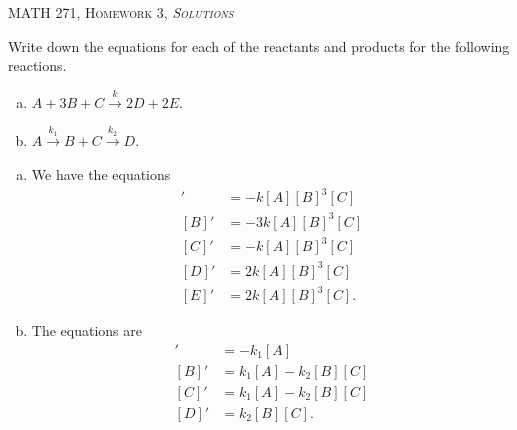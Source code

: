 \documentclass[12pt]{article} %
\begin{document}
\begin{center}
   \textsc{\large MATH 271, Homework 3, \emph{Solutions}}\\
\end{center}
\vspace{.5cm}

\begin{problem}
Write down the equations for each of the reactants and products for the following reactions.
\begin{enumerate}[(a)]
    \item $A + 3B + C \xrightarrow{k} 2D+2E$.
    \item $A \xrightarrow{k_1} B + C \xrightarrow{k_2} D$.
\end{enumerate}
\end{problem}
\begin{solution}
\begin{enumerate}[(a)]
    \item We have the equations
    \begin{align*}
        [A]' &= -k[A][B]^3[C]\\
        [B]' &= -3k[A][B]^3[C]\\
        [C]' &= -k[A][B]^3[C]\\
        [D]' &= 2k[A][B]^3[C]\\
        [E]' &= 2k[A][B]^3[C].
    \end{align*}
    \item The equations are
    \begin{align*}
        [A]' &= -k_1[A]\\
        [B]' &= k_1[A] - k_2 [B][C]\\
        [C]' &= k_1[A] - k_2 [B][C]\\
        [D]' &= k_2[B][C].
    \end{align*}
\end{enumerate}
\end{solution}

\newpage
\end{document}
